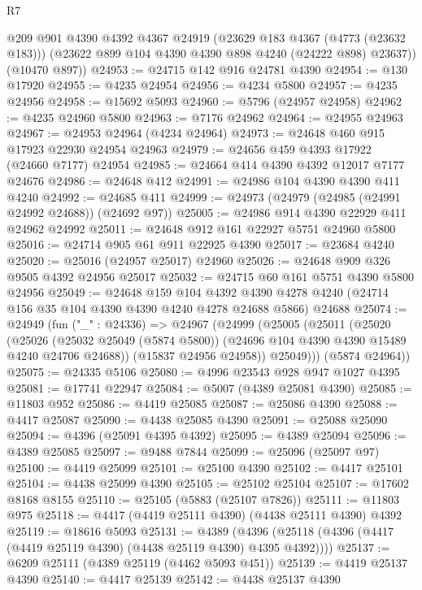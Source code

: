 \begin{lexlean}{R7}
\begin{coremodule}
        @209
        @901
        @4390
        @4392
        @4367
        @24919
        (@23629 @183 @4367 (@4773 (@23632 @183)))
        (@23622 @899 @104 @4390 @4390 @898 @4240 (@24222 @898) @23637))
      (@10470 @897))
@24953 := @24715 @142 @916 @24781 @4390
@24954 := @130 @17920
@24955 := @4235 @24954
@24956 := @4234 @5800
@24957 := @4235 @24956
@24958 := @15692 @5093
@24960 := @5796 (@24957 @24958)
@24962 := @4235 @24960 @5800
@24963 := @7176 @24962
@24964 := @24955 @24963
@24967 := @24953 @24964 (@4234 @24964)
@24973 := @24648 @460 @915 @17923 @22930 @24954 @24963
@24979 := @24656 @459 @4393 @17922 (@24660 @7177) @24954
@24985 := @24664 @414 @4390 @4392 @12017 @7177 @24676
@24986 := @24648 @412
@24991 := @24986 @104 @4390 @4390 @411 @4240
@24992 := @24685 @411
@24999 := @24973 (@24979 (@24985 (@24991 @24992 @24688)) (@24692 @97))
@25005 := @24986 @914 @4390 @22929 @411 @24962 @24992
@25011 := @24648 @912 @161 @22927 @5751 @24960 @5800
@25016 := @24714 @905 @61 @911 @22925 @4390
@25017 := @23684 @4240
@25020 := @25016 (@24957 @25017) @24960
@25026 := @24648 @909 @326 @9505 @4392 @24956 @25017
@25032 := @24715 @60 @161 @5751 @4390 @5800 @24956
@25049 := @24648
    @159
    @104
    @4392
    @4390
    @4278
    @4240
    (@24714 @156 @35 @104 @4390 @4390 @4240 @4278 @24688 @5866)
    @24688
@25074 := @24949
    (fun ("_" : @24336) =>
    @24967
      (@24999
        (@25005
          (@25011
            (@25020
              (@25026
                (@25032 @25049 (@5874 @5800))
                (@24696 @104 @4390 @4390 @15489 @4240 @24706 @24688))
              (@15837 @24956 @24958))
            @25049)))
      (@5874 @24964))
@25075 := @24335 @5106
@25080 := @4996 @23543 @928 @947 @1027 @4395
@25081 := @17741 @22947
@25084 := @5007 (@4389 @25081 @4390)
@25085 := @11803 @952
@25086 := @4419 @25085
@25087 := @25086 @4390
@25088 := @4417 @25087
@25090 := @4438 @25085 @4390
@25091 := @25088 @25090
@25094 := @4396 (@25091 @4395 @4392)
@25095 := @4389 @25094
@25096 := @4389 @25085
@25097 := @9488 @7844
@25099 := @25096 (@25097 @97)
@25100 := @4419 @25099
@25101 := @25100 @4390
@25102 := @4417 @25101
@25104 := @4438 @25099 @4390
@25105 := @25102 @25104
@25107 := @17602 @8168 @8155
@25110 := @25105 (@5883 (@25107 @7826))
@25111 := @11803 @975
@25118 := @4417 (@4419 @25111 @4390) (@4438 @25111 @4390) @4392
@25119 := @18616 @5093
@25131 := @4389
    (@4396 (@25118 (@4396 (@4417 (@4419 @25119 @4390) (@4438 @25119 @4390) @4395 @4392))))
@25137 := @6209 @25111 (@4389 @25119 (@4462 @5093 @451))
@25139 := @4419 @25137 @4390
@25140 := @4417 @25139
@25142 := @4438 @25137 @4390

\end{coremodule}
\end{lexlean}
